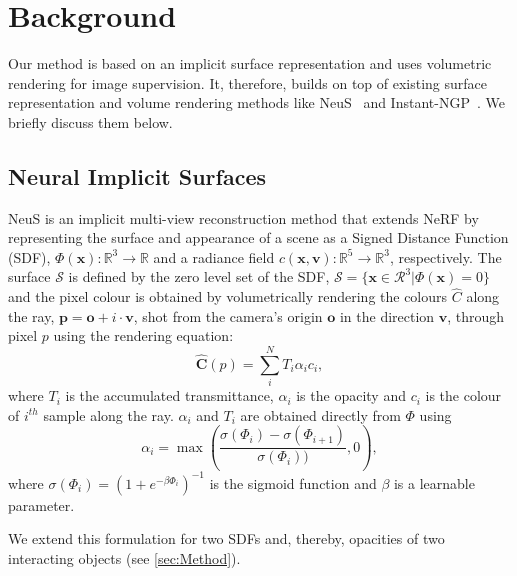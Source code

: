 \section{Background}
Our method is based on an implicit surface representation and uses volumetric rendering for image supervision.
It, therefore, builds on top of existing surface representation and volume rendering methods like NeuS~\cite{wang2021neus} 
and Instant-NGP~\cite{mueller2022instant}. 
We briefly discuss them below. 
\subsection{Neural Implicit Surfaces} 
NeuS \cite{wang2021neus} 
is an implicit multi-view reconstruction method that extends NeRF \cite{mildenhall2020nerf} by representing the surface and appearance of a scene as a Signed Distance Function (SDF),  $\Phi(\mathbf{x}): \mathbb{R}^3 \rightarrow \mathbb{R}$ and a radiance field $c(\mathbf{x}, \mathbf{v}): \mathbb{R}^5 \rightarrow \mathbb{R}^3$,  respectively. 
The surface $\mathcal{S}$ is defined by the zero level set of the SDF, $\mathcal{S} = \{ \mathbf{x} \in \mathcal{R}^3 | \Phi(\mathbf{x}) = 0 \}$ and the pixel colour is obtained by volumetrically rendering the colours $\hat{C}$ along the ray,  $\mathbf{p} = \mathbf{o} + i \cdot \mathbf{v}$, shot from the camera's origin $\mathbf{o}$ in the direction $\mathbf{v}$, through pixel $p$ using the rendering equation: 
\begin{equation} \label{eq:vol_render}
    \mathbf{\hat{C}}(p) = \sum_i^{N} T_i \alpha_i c_i, 
\end{equation}
where $T_i$ is the accumulated transmittance, $\alpha_i$ is the opacity and $c_i$ is the colour of $i^{th}$ sample along the ray. 
$\alpha_i$ and 
$T_i$ are obtained directly from 
$\Phi$ 
using 
\begin{equation}\label{eq:neus_opacity}
    \alpha_i = \max\left(\frac{\sigma(\Phi_i) - \sigma(\Phi_{i+1})}{\sigma(\Phi_i))}, 0 \right), 
\end{equation}
where $\sigma(\Phi_i) = (1 + e^{-\beta \Phi_i})^{-1}$ is the sigmoid function and $\beta$ is a learnable parameter.

We extend this formulation 
for two SDFs and, thereby, opacities of two interacting objects (see \cref{sec:Method}). 

